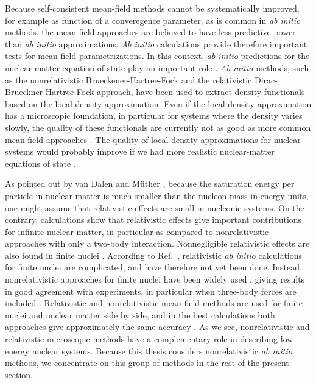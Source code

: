 \documentclass[a4paper,12pt]{report}
\begin{document}
Because self-consistent mean-field methods cannot be 
systematically improved, for example as function of a
converegence parameter, as
is common in \emph{ab initio} methods, the mean-field 
approaches are believed to have less predictive power than 
\emph{ab initio} approximations. \emph{Ab initio} calculations
provide therefore important tests for mean-field 
parametrizations. In this context, \emph{ab initio} 
predictions for the nuclear-matter equation of state play 
an important role \cite{stone_2007}. \emph{Ab initio} methods,
such as the nonrelativistic Brueckener-Hartree-Fock and 
the relativistic Dirac-Brueckner-Hartree-Fock approach, 
have been used \cite{dalen2010,baldo2004,cao2006,stone_2007} 
to extract density functionals based on the local density 
approximation. Even if the local density approximation has a 
microscopic foundation, in particular for systems where 
the density varies slowly, the quality of these functionals 
are currently not as good as more common mean-field 
approaches \cite{stone_2007}. The quality of local density
approximations for nuclear systems would probably improve
if we had more realistic nuclear-matter equations of state 
\cite{drut2010,hebeler2011}.

As pointed out by van Dalen and M{\"u}ther \cite{dalen2009}, 
because the saturation energy per particle in nuclear matter 
is much smaller than the nucleon mass in energy units, one might 
assume that relativistic effects are small in nucleonic 
systems. On the contrary, calculations show \cite{dalen2009} 
that relativistic effects give important contributions for 
infinite nuclear matter, in particular as compared to 
nonrelativistic approaches with only a two-body interaction.   
Nonnegligible relativistic effects are also found in
finite nuclei \cite{dalen2009}. According to
Ref.~\cite{dalen2009}, relativistic \emph{ab initio}
calculations for finite nuclei are complicated, and have 
therefore not yet been done. Instead, nonrelativistic
approaches for finite nuclei have been widely used 
\cite{pieper2001,dickhoff2004,navratil2009,hagen2013c},
giving results in good agreement with experiments, 
in particular when three-body forces are included 
\cite{pieper2001,hagen2012,roth2013,hammer2013,cipallone2013}.   
Relativistic and nonrelativistic mean-field methods
are used for finite nuclei and nuclear matter side by side,
and in the best calculations both approaches give 
approximately the same accuracy \cite{stone_2007}. 
As we see, nonrelativistic and relativistic microscopic
methods have a complementary role in describing
low-energy nuclear systems. Because this thesis considers
nonrelativistic \emph{ab initio} methods, we concentrate
on this group of methods in the rest of the present
section.
\end{document}
